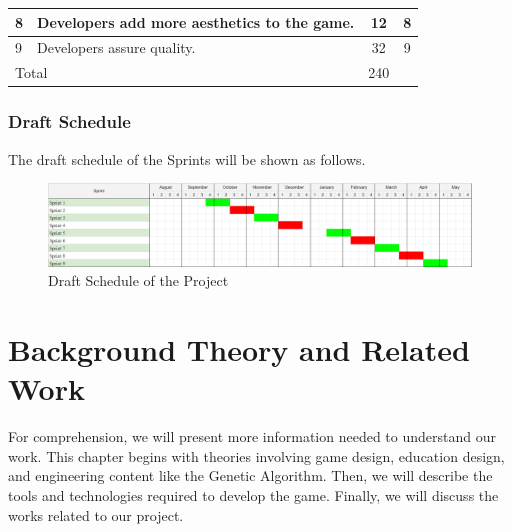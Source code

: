 \documentclass[12pt,oneside,openright,a4paper]{cpe-english-project}
\begin{document}
\begin{table}[!h]
\begin{tabular}{|ll|c|c|}
\multicolumn{1}{|l|}{8}                          & Developers add more aesthetics to the game.                                  & 12                                                                        & 8        \\ \hline
\multicolumn{1}{|l|}{9}                          & Developers assure quality.                                                   & 32                                                                        & 9        \\ \hline
\multicolumn{2}{|l|}{Total}                                                                                                     & 240                                                                       &          \\ \hline
\end{tabular}
\end{table}

\subsection{Draft Schedule}
The draft schedule of the Sprints will be shown as follows.

\begin{figure}[!h]\centering
\includegraphics[width=16cm]{figure/intro-gantt-chart.png}
\caption{Draft Schedule of the Project}
\label{fig:intro-gantt-chart}
\end{figure}



\chapter{Background Theory and Related Work}
\hspace{2em}For comprehension, we will present more information needed to understand our work. This chapter begins with theories involving game design, education design, and engineering content like the Genetic Algorithm. Then, we will describe the tools and technologies required to develop the game. Finally, we will discuss the works related to our project.
\end{document}
